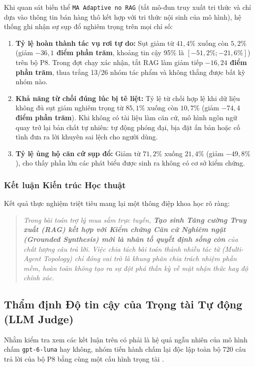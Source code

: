 Khi quan sát biến thể \texttt{MA Adaptive no RAG} (tắt mô-đun truy xuất tri thức và chỉ dựa vào thông tin bán hàng thô kết hợp với tri thức nội sinh của mô hình), hệ thống ghi nhận sự sụp đổ nghiêm trọng trên mọi chỉ số:
\begin{enumerate}
    \item \textbf{Tỷ lệ hoàn thành tác vụ rơi tự do:} Sụt giảm từ $41{,}4\%$ xuống còn $5{,}2\%$ (giảm \textbf{$-36{,}1$ điểm phần trăm}, khoảng tin cậy 95\% là $[-51{,}2\%; -21{,}6\%]$) trên bộ P8. Trong đợt chạy xác nhận, tắt RAG làm giảm tiếp \textbf{$-16{,}24$ điểm phần trăm}, thua trắng 13/26 nhóm tác phẩm và không thắng được bất kỳ nhóm nào.
    \item \textbf{Khả năng từ chối đúng lúc bị tê liệt:} Tỷ lệ từ chối hợp lệ khi dữ liệu không đủ sụt giảm nghiêm trọng từ $85{,}1\%$ xuống còn $10{,}7\%$ (giảm \textbf{$-74{,}4$ điểm phần trăm}). Khi không có tài liệu làm căn cứ, mô hình ngôn ngữ quay trở lại bản chất tự nhiên: tự động phóng đại, bịa đặt ấn bản hoặc cố tình đưa ra lời khuyên sai lệch cho người dùng.
    \item \textbf{Tỷ lệ ủng hộ căn cứ sụp đổ:} Giảm từ $71{,}2\%$ xuống $21{,}4\%$ (giảm $-49{,}8\%$), cho thấy phần lớn các phát biểu được sinh ra không có cơ sở kiểm chứng.
\end{enumerate}

\subsubsection{Kết luận Kiến trúc Học thuật}
Kết quả thực nghiệm triệt tiêu mang lại một thông điệp khoa học rõ ràng:
\begin{quote}
\textit{Trong bài toán trợ lý mua sắm trực tuyến, \textbf{Tạo sinh Tăng cường Truy xuất (RAG) kết hợp với Kiểm chứng Căn cứ Nghiêm ngặt (Grounded Synthesis) mới là nhân tố quyết định sống còn} của chất lượng câu trả lời. Việc chia tách bài toán thành nhiều tác tử (Multi-Agent Topology) chỉ đóng vai trò là khung phân chia trách nhiệm phần mềm, hoàn toàn không tạo ra sự đột phá thần kỳ về mặt nhận thức hay độ chính xác.}
\end{quote}

\subsection{Thẩm định Độ tin cậy của Trọng tài Tự động (LLM Judge)}
Nhằm kiểm tra xem các kết luận trên có phải là hệ quả ngẫu nhiên của mô hình chấm \texttt{gpt-6-luna} hay không, nhóm tiến hành chấm lại độc lập toàn bộ 720 câu trả lời của bộ P8 bằng cùng một cấu hình trọng tài .

